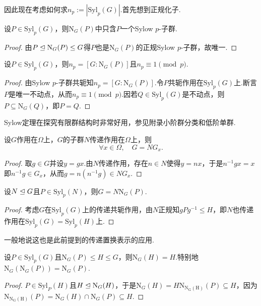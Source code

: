 因此现在考虑如何求$n_p:=|\mathrm{Syl}_p(G)|$.首先想到正规化子.
\begin{lemma*}
	设$P\in\mathrm{Syl}_p(G)$，则$\mathrm{N}_G(P)$中只含$P$一个Sylow $p$-子群.
\end{lemma*}
\begin{proof}
	由$P\trianglelefteq\mathrm{N}_G(P)\le G$得$P$也是$\mathrm{N}_G(P)$的正规Sylow $p$-子群，故唯一.
\end{proof}
\begin{thm}[(Sylow第三定理)]
	设$P\in\mathrm{Syl}_p(G)$，则$n_p=[G:\mathrm{N}_G(P)]$且$n_p\equiv 1\pmod{p}$.
\end{thm}
\begin{proof}
	由Sylow $p$-子群共轭知$n_p=[G:\mathrm{N}_G(P)]$.令$P$共轭作用在$\mathrm{Syl}_p(G)$上.断言$P$是唯一不动点，从而$n_p\equiv 1\pmod{p}$.因若$Q\in\mathrm{Syl}_p(G)$是不动点，则$P\subseteq\mathrm{N}_G(Q)$，即$P=Q$.
\end{proof}

Sylow定理在探究有限群结构时非常好用，参见附录小阶群分类和低阶单群.%
\begin{prop}[(Frattini)]
	设$G$作用在$\Omega$上，$G$的子群$N$传递作用在$\Omega$上，则
	\[
		\forall x\in\Omega,\quad G=NG_x.
	\]
\end{prop}
\begin{proof}
	取$g\in G$并设$y=gx$.由$N$传递作用，存在$n\in N$使得$y=nx$，于是$n^{-1}gx=x$即$n^{-1}g\in G_x$，从而$g=n(n^{-1}g)\in NG_x$.
\end{proof}
\begin{cor*}[(Frattini)]
	设$N\trianglelefteq G$且$P\in\mathrm{Syl}_p(N)$，则$G=N\mathrm{N}_G(P)$.
\end{cor*}
\begin{proof}
	考虑$G$在$\mathrm{Syl}_p(G)$上的传递共轭作用，由$N$正规知$gPg^{-1}\le H$，即$N$也传递作用在$\mathrm{Syl}_p(G)=\mathrm{Syl}_p(H)$上.
\end{proof}
\begin{remark}
	一般地说这也是此前提到的传递置换表示的应用.
\end{remark}
\begin{cor*}
	设$P\in\mathrm{Syl}_p(G)$且$\mathrm{N}_G(P)\le H\le G$，则$\mathrm{N}_G(H)=H$.特别地$\mathrm{N}_G(\mathrm{N}_G(P))=\mathrm{N}_G(P)$.
\end{cor*}
\begin{proof}
	$P\in\mathrm{Syl}_P(H)$且$H\trianglelefteq\mathrm{N}_G(H)$，于是$\mathrm{N}_G(H)=H\mathrm{N}_{\mathrm{N_G(H)}}(P)\subseteq H$，因为$\mathrm{N}_{\mathrm{N_G(H)}}(P)=\mathrm{N}_G(H)\cap\mathrm{N}_G(P)\subseteq H$.
\end{proof}

